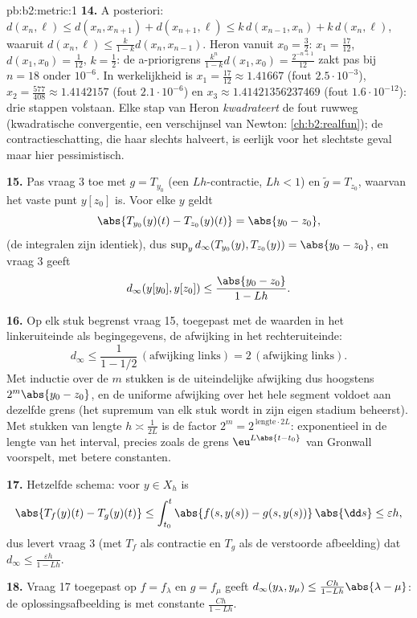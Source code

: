 \begin{solution}{pb:b2:metric:1}
\textbf{14.} A posteriori: $d(x_n, \ell) \leq d(x_n, x_{n+1}) +
d(x_{n+1}, \ell) \leq k\,d(x_{n-1}, x_n) + k\,d(x_n, \ell)$,
waaruit $d(x_n, \ell) \leq \frac{k}{1-k}d(x_n, x_{n-1})$. Heron
vanuit $x_0 = \frac32$: $x_1 = \frac{17}{12}$, $d(x_1, x_0) =
\frac1{12}$, $k = \frac12$: de a-priorigrens
$\frac{k^n}{1-k}d(x_1,x_0) = \frac{2^{-n+1}}{12}$ zakt pas bij $n =
18$ onder $10^{-6}$. In werkelijkheid is $x_1 = \frac{17}{12}
\approx 1.41667$ (fout $2.5\cdot10^{-3}$), $x_2 = \frac{577}{408}
\approx 1.4142157$ (fout $2.1\cdot10^{-6}$) en $x_3 \approx
1.41421356237469$ (fout $1.6\cdot10^{-12}$): drie stappen
volstaan. Elke stap van Heron \emph{kwadrateert} de fout ruwweg
(kwadratische convergentie, een verschijnsel van Newton:
\cref{ch:b2:realfun}); de contractieschatting, die haar slechts
halveert, is eerlijk voor het slechtste geval maar hier
pessimistisch.

\textbf{15.} Pas vraag 3 toe met $g = T_{y_0}$ (een
$Lh$-contractie, $Lh < 1$) en $\widetilde g = T_{z_0}$, waarvan het
vaste punt $y[z_0]$ is. Voor elke $y$ geldt
\[
\abs{T_{y_0}(y)(t) - T_{z_0}(y)(t)} = \abs{y_0 - z_0},
\]
(de integralen zijn identiek), dus $\sup_y
d_\infty(T_{y_0}(y), T_{z_0}(y)) = \abs{y_0 - z_0}$, en vraag 3
geeft
\[
d_\infty(y[y_0], y[z_0]) \leq \frac{\abs{y_0 - z_0}}{1 - Lh} .
\]

\textbf{16.} Op elk stuk begrenst vraag 15, toegepast met de
waarden in het linkeruiteinde als begingegevens, de afwijking in
het rechteruiteinde:
\[
d_\infty \leq \frac{1}{1 - 1/2}\,(\text{afwijking links})
= 2\,(\text{afwijking links}) .
\] Met
inductie over de $m$ stukken is de uiteindelijke afwijking dus
hoogstens $2^m\abs{y_0 - z_0}$, en de uniforme afwijking over het
hele segment voldoet aan dezelfde grens (het supremum van elk stuk
wordt in zijn eigen stadium beheerst). Met stukken van lengte $h
\asymp \frac1{2L}$ is de factor $2^m = 2^{\,\text{lengte}\cdot
2L}$: exponentieel in de lengte van het interval, precies zoals de
grens $\eu^{L\abs{t-t_0}}$ van Gronwall voorspelt, met betere
constanten.

\textbf{17.} Hetzelfde schema: voor $y \in X_h$ is
\[
\abs{T_f(y)(t) - T_g(y)(t)} \leq \int_{t_0}^t \abs{f(s,y(s)) -
g(s,y(s))}\,\abs{\dd s} \leq \varepsilon h ,
\]
dus levert vraag 3 (met $T_f$ als contractie en $T_g$ als de
verstoorde afbeelding) dat $d_\infty \leq \frac{\varepsilon h}{1 -
Lh}$.

\textbf{18.} Vraag 17 toegepast op $f = f_\lambda$ en $g = f_\mu$
geeft $d_\infty(y_\lambda, y_\mu) \leq \frac{Ch}{1 -
Lh}\abs{\lambda - \mu}$: de oplossingsafbeelding is  met
constante $\frac{Ch}{1-Lh}$.


\end{solution}

